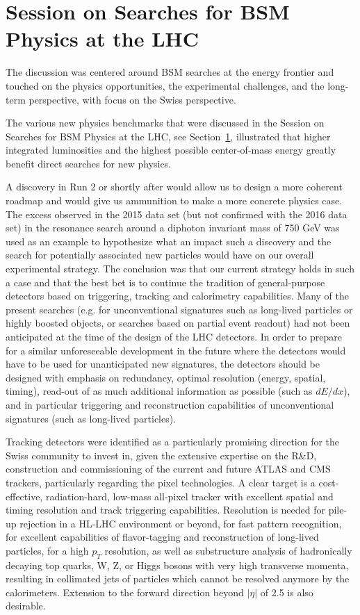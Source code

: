 \section{Session on Searches for BSM Physics at the LHC}\label{lhcbsm}

The discussion was centered around BSM searches at the energy frontier and touched on the physics 
opportunities, the experimental challenges, and the long-term perspective, with focus on the Swiss 
perspective.

The various new physics benchmarks that were discussed in the Session on Searches for BSM Physics at 
the LHC, see Section~\ref{lhcbsm}, illustrated that higher integrated luminosities and the highest 
possible center-of-mass energy greatly benefit direct searches for new physics.

A discovery in Run 2 or shortly after would allow us to design a more coherent roadmap and would give 
us ammunition to make a more concrete physics case.  The excess observed in the 2015 data set (but not 
confirmed with the 2016 data set) in the resonance search around a diphoton invariant mass of 750 GeV 
was used as an example to hypothesize what an impact such a discovery and the search for potentially 
associated new particles would have on our overall experimental strategy.  The conclusion was that our 
current strategy holds in such a case and that the best bet is to continue the tradition of 
general-purpose detectors based on triggering, tracking and calorimetry capabilities.  Many of the 
present searches (e.g. for unconventional signatures such as long-lived particles or highly boosted 
objects, or searches based on partial event readout) had not been anticipated at the time of the 
design of the LHC detectors.  In order to prepare for a similar unforeseeable development in the 
future where the detectors would have to be used for unanticipated new signatures, the detectors 
should be designed with emphasis on redundancy, optimal resolution (energy, spatial, timing), read-out 
of as much additional information as possible (such as $dE/dx$), and in particular triggering and 
reconstruction capabilities of unconventional signatures (such as long-lived particles).

Tracking detectors were identified as a particularly promising direction for the Swiss community to 
invest in, given the extensive expertise on the R\&D, construction and commissioning of the current 
and future ATLAS and CMS trackers, particularly regarding the pixel technologies.  A clear target is a 
cost-effective, radiation-hard, low-mass all-pixel tracker with excellent spatial and timing 
resolution and track triggering capabilities.  Resolution is needed for pile-up rejection in a HL-LHC 
environment or beyond, for fast pattern recognition, for excellent capabilities of flavor-tagging and 
reconstruction of long-lived particles, for a high $p_T$ resolution, as well as substructure analysis 
of hadronically decaying top quarks, W, Z, or Higgs bosons with very high transverse momenta, 
resulting in collimated jets of particles which cannot be resolved anymore by the calorimeters.  
Extension to the forward direction beyond $|\eta |$ of 2.5 is also desirable.

